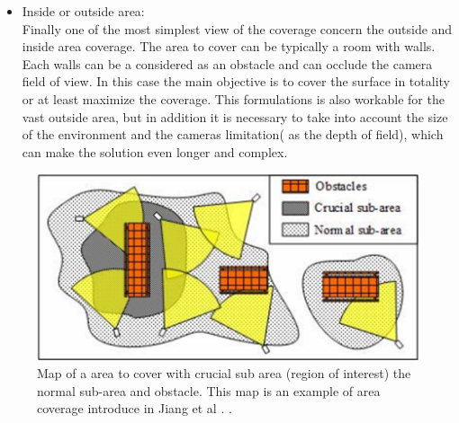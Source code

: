 \begin{itemize}
\item Inside or outside area:\\ 
Finally one of the most simplest  view of the coverage concern the outside and inside area coverage. The area to cover can be typically a room with walls. Each walls can be a considered as an obstacle and can occlude the camera field of view. In this case the main objective is to cover the surface in totality or at least maximize the coverage. This formulations is also workable for the vast outside area, but in addition it is necessary to take into account the size of the environment and the cameras limitation( as the depth of field), which can make the solution even longer and complex.
   
\end{itemize}
  


\begin{figure}[t!]
   \includegraphics[width=\linewidth]{img/MapRoI165.png}
  \caption{ Map of a area to cover with  crucial sub area (region of interest) the normal sub-area  and obstacle. This map is an example of area coverage  introduce in  Jiang et al \cite{165*jiang2010}. 
.}\label{fig:MapRoI165}
  \endminipage\hfill
\end{figure}

